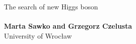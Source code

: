 \documentclass[a1,portrait]{a0poster}
\begin{document}
\begin{minipage}[b]{0.6\linewidth}
\Huge \color{2} {The search of new Higgs boson} \color{Black}\\ %
\\[1cm] %
\large \textbf{Marta Sawko and Grzegorz Czelusta}
\\[0.5cm] %
University of Wrocław
\\[0.4cm] %
\end{minipage}

\begin{minipage}[b]{0.4\linewidth}

\end{minipage}






\end{document}
